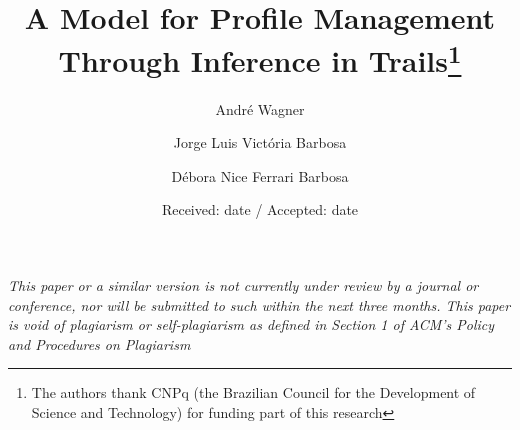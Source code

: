 \documentclass{svjour3}                     %
\begin{document}
\title{A Model for Profile Management Through Inference in Trails\thanks{The authors thank CNPq (the Brazilian Council for the Development of Science and Technology) for funding part of this research}}


\author{André Wagner                     \and
        Jorge Luis Victória Barbosa	 \and
	Débora Nice Ferrari Barbosa
}



\date{Received: date / Accepted: date}


\maketitle

\textit{This paper or a similar version is not currently under review by a journal or conference, nor will be submitted to such within the next three months. This paper is void of plagiarism or self-plagiarism as defined in Section 1 of ACM's Policy and Procedures on Plagiarism}\\[1cm]
\end{document}
